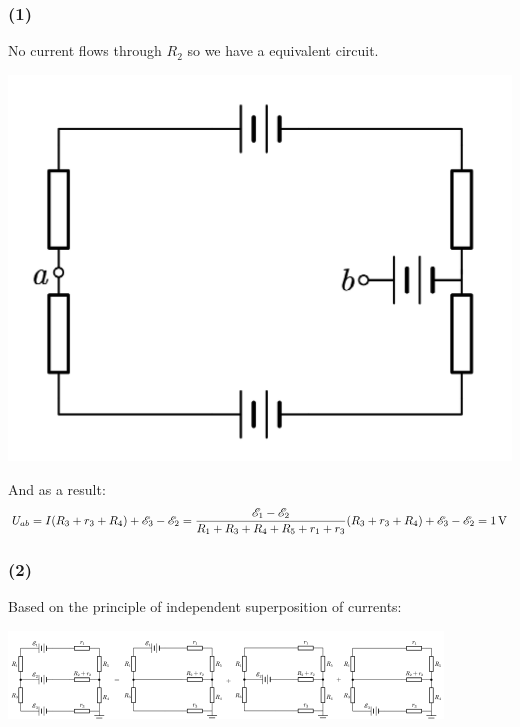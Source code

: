 \documentclass[a4paper,11pt]{amsart}
\theoremstyle{definition}
\begin{document}
	\subsubsection*{(1)}
	No current flows through $R_2$ so we have a equivalent circuit.
	
	\begin{center}
		\centering
		\includegraphics[width=0.3\linewidth]{../EarlyPic/3-21}
		\label{fig:3-21}
	\end{center}
	And as a result:
	$$
	U_{ab}=I(R_3+r_3+R_4)+\mathscr{E}_3-\mathscr{E}_2=\dfrac{\mathscr{E}_1-\mathscr{E}_2}{R_1+R_3+R_4+R_5+r_1+r_3}(R_3+r_3+R_4)+\mathscr{E}_3-\mathscr{E}_2=1\thinspace\mathrm{V}
	$$
	
	\subsubsection*{(2)}
	Based on the principle of independent superposition of currents:
	
		\begin{center}
				\includegraphics[width=1\linewidth]{../LatePic/3-21-(2)}
			\label{fig:3-21-2}
		\end{center}
	
\end{document}
